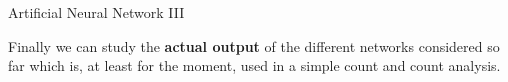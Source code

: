 \documentclass[handout,8 pt]{beamer}
\begin{document}
\begin{frame}{Artificial Neural Network III}

	\justifying
	Finally we can study the \textbf{actual output} of the different networks considered so far which is, at least for the moment, used in a simple count and count analysis. \vfill
	
	\hspace{4pt}
   \begin{minipage}[c]{.02\linewidth}
	\begin{exampleblock}{}  \end{exampleblock}
   \end{minipage}
   \hspace{5pt}
	\begin{minipage}[c]{.44\linewidth}
   \end{minipage} \hfill
   \hspace{10pt}
   \begin{minipage}[c]{.44\linewidth}
   \end{minipage} \hfill \vfill
   

\end{frame}
\end{document}
